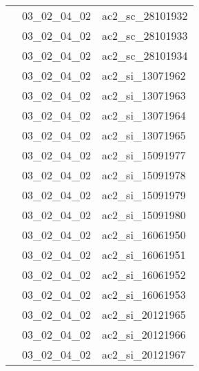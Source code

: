 \documentclass[12pt,titlepage]{book}
\begin{document}
\begin{supertabular}{|p{10cm}|c|p{15cm}|}
                    & 03\_02\_04\_02 & ac2\_sc\_28101932\\


                    & 03\_02\_04\_02 & ac2\_sc\_28101933\\


                    & 03\_02\_04\_02 & ac2\_sc\_28101934\\


                    & 03\_02\_04\_02 & ac2\_si\_13071962\\


                    & 03\_02\_04\_02 & ac2\_si\_13071963\\


                    & 03\_02\_04\_02 & ac2\_si\_13071964\\


                    & 03\_02\_04\_02 & ac2\_si\_13071965\\


                    & 03\_02\_04\_02 & ac2\_si\_15091977\\


                    & 03\_02\_04\_02 & ac2\_si\_15091978\\


                    & 03\_02\_04\_02 & ac2\_si\_15091979\\


                    & 03\_02\_04\_02 & ac2\_si\_15091980\\


                    & 03\_02\_04\_02 & ac2\_si\_16061950\\


                    & 03\_02\_04\_02 & ac2\_si\_16061951\\


                    & 03\_02\_04\_02 & ac2\_si\_16061952\\


                    & 03\_02\_04\_02 & ac2\_si\_16061953\\


                    & 03\_02\_04\_02 & ac2\_si\_20121965\\


                    & 03\_02\_04\_02 & ac2\_si\_20121966\\


                    & 03\_02\_04\_02 & ac2\_si\_20121967\\



\end{supertabular}
\end{document}
